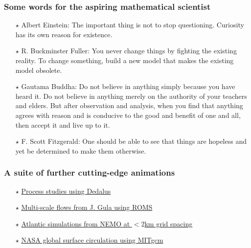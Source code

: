 \documentclass[10pt]{beamer}
\begin{document}
\begin{frame}
  \frametitle{Some words for the aspiring mathematical scientist}

\begin{exampleblock}{}

\begin{itemize} 

\item[$\star$] {\sc Albert Einstein:} The important thing is not to
  stop questioning. Curiosity has its own reason for existence.

\item[$\star$] {\sc R. Buckminster Fuller:} You never change things by
  fighting the existing reality. To change something, build a new
  model that makes the existing model obsolete.

\item[$\star$] {\sc Gautama Buddha:} Do not believe in anything simply
  because you have heard it.  Do not believe in anything merely on the
  authority of your teachers and elders. But after observation and
  analysis, when you find that anything agrees with reason and is
  conducive to the good and benefit of one and all, then accept it and
  live up to it.


\item[$\star$] {\sc F. Scott Fitzgerald:} One should be able to see
  that things are hopeless and yet be determined to make them
  otherwise.



\end{itemize}

\end{exampleblock}{}

\end{frame}


\begin{frame}
  \frametitle{A suite of further cutting-edge animations}

\begin{itemize} 

\item[$\star$] 
\href{https://vimeo.com/dedalus}{Process studies using Dedalus}

\item[$\star$] 
\href{http://stockage.univ-brest.fr/~gula/movies.html}{Multi-scale flows from J. Gula using ROMS}

\item[$\star$] 
\href{https://vimeo.com/oceannext}{Atlantic simulations from NEMO at $<2$km grid spacing}

\item[$\star$] 
\href{https://www.youtube.com/watch?v=CCmTY0PKGDs}{NASA global surface circulation using MITgcm}


\end{itemize}

\end{frame}
\end{document}
